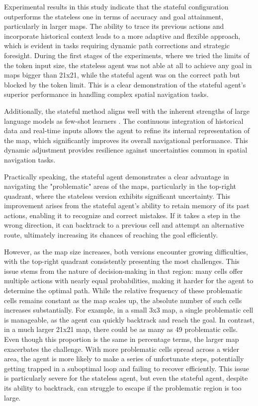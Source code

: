 Experimental results in this study indicate that the stateful configuration
outperforms the stateless one in terms of accuracy and goal attainment, particularly
in larger maps. The ability to trace its previous actions and incorporate
historical context leads to a more adaptive and flexible approach, which is evident
in tasks requiring dynamic path corrections and strategic foresight. During the
first stages of the experiments, where we tried the limits of the token input size,
the stateless agent was not able at all to achieve any goal in maps bigger than
21x21, while the stateful agent was on the correct path but blocked by the token
limit. This is a clear demonstration of the stateful agent's superior
performance in handling complex spatial navigation tasks.

Additionally, the stateful method aligns well with the inherent strengths of large
language models as few-shot learners \cite{brown2020languagemodelsfewshotlearners}.
The continuous integration of historical data and real-time inputs allows the
agent to refine its internal representation of the map, which significantly improves
its overall navigational performance. This dynamic adjustment provides
resilience against uncertainties common in spatial navigation tasks.

Practically speaking, the stateful agent demonstrates a clear advantage in navigating
the "problematic" areas of the maps, particularly in the top-right quadrant, where
the stateless version exhibits significant uncertainty. This improvement arises
from the stateful agent's ability to retain memory of its past actions, enabling
it to recognize and correct mistakes. If it takes a step in the wrong direction,
it can backtrack to a previous cell and attempt an alternative route, ultimately
increasing its chances of reaching the goal efficiently.

However, as the map size increases, both versions encounter growing difficulties,
with the top-right quadrant consistently presenting the most challenges. This
issue stems from the nature of decision-making in that region: many cells offer multiple
actions with nearly equal probabilities, making it harder for the agent to
determine the optimal path. While the relative frequency of these problematic cells
remains constant as the map scales up, the absolute number of such cells
increases substantially. For example, in a small 3x3 map, a single problematic cell
is manageable, as the agent can quickly backtrack and reach the goal. In contrast,
in a much larger 21x21 map, there could be as many as 49 problematic cells. Even
though this proportion is the same in percentage terms, the larger map exacerbates
the challenge. With more problematic cells spread across a wider area, the agent
is more likely to make a series of unfortunate steps, potentially getting
trapped in a suboptimal loop and failing to recover efficiently. This issue is particularly
severe for the stateless agent, but even the stateful agent, despite its ability
to backtrack, can struggle to escape if the problematic region is too large.

